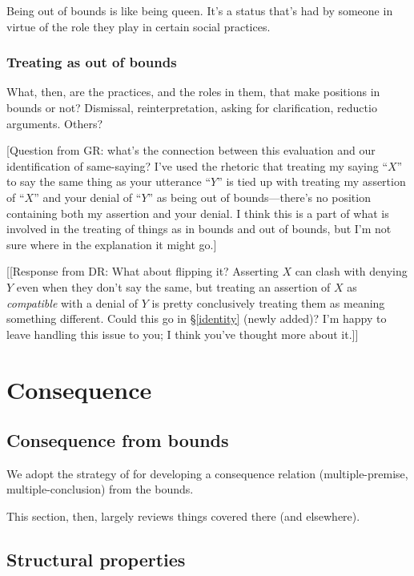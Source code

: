 \documentclass{article}
\begin{document}
Being out of bounds is like being queen.
It's a status that's had by someone in virtue of the role they play in certain social practices.

\subsubsection{Treating as out of bounds} \label{treating}

What, then, are the practices, and the roles in them, that make positions in bounds or not?
Dismissal, reinterpretation, asking for clarification, reductio arguments. Others? 

[Question from GR: what's the connection between this evaluation and our identification of same-saying? I've used the rhetoric that treating my saying ``$X$'' to say the same thing as your utterance ``$Y$'' is tied up with treating my assertion of ``$X$'' and your denial of ``$Y$'' as being out of bounds---there's no position containing both my assertion and your denial. I think this is a part of what is involved in the treating of things as in bounds and out of bounds, but I'm not sure where in the explanation it might go.]

[[Response from DR: What about flipping it? Asserting $X$ can clash with denying $Y$ even when they don't say the same, but treating an assertion of $X$ as {\em compatible} with a denial of $Y$ is pretty conclusively treating them as meaning something different. Could this go in \S\ref{identity} (newly added)? I'm happy to leave handling this issue to you; I think you've thought more about it.]]

\section{Consequence} \label{consequence}

\subsection{Consequence from bounds}

We adopt the strategy of \cite{restall:mc} for developing a consequence relation (multiple-premise, multiple-conclusion) from the bounds.

This section, then, largely reviews things covered there (and elsewhere).


\subsection{Structural properties}
\end{document}

